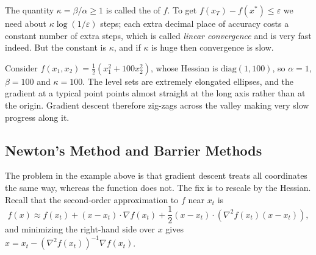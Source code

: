 The quantity $\kappa = \beta/\alpha \geq 1$ is called the  of $f$. To get $f(x_T) - f(x^*) \leq \varepsilon$ we need about $\kappa \log(1/\varepsilon)$ steps; each extra decimal place of accuracy costs a constant number of extra steps, which is called \emph{linear convergence} and is very fast indeed. But the constant is $\kappa$, and if $\kappa$ is huge then convergence is slow.

\begin{example}
    Consider $f(x_1, x_2) = \frac{1}{2}(x_1^2 + 100x_2^2)$, whose Hessian is $\mathrm{diag}(1, 100)$, so $\alpha = 1$, $\beta = 100$ and $\kappa = 100$. The level sets are extremely elongated ellipses, and the gradient at a typical point points almost straight at the long axis rather than at the origin. Gradient descent therefore zig-zags across the valley making very slow progress along it.
\end{example}

\begin{center}
\end{center}

\subsection{Newton's Method and Barrier Methods}

The problem in the example above is that gradient descent treats all coordinates the same way, whereas the function does not. The fix is to rescale by the Hessian. Recall that the second-order approximation to $f$ near $x_t$ is
$$
f(x) \approx f(x_t) + (x - x_t)\cdot \nabla f(x_t) + \frac{1}{2}(x - x_t) \cdot \left(\nabla^2 f(x_t)(x - x_t)\right),
$$
and minimizing the right-hand side over $x$ gives $x = x_t - (\nabla^2 f(x_t))^{-1}\nabla f(x_t)$.

